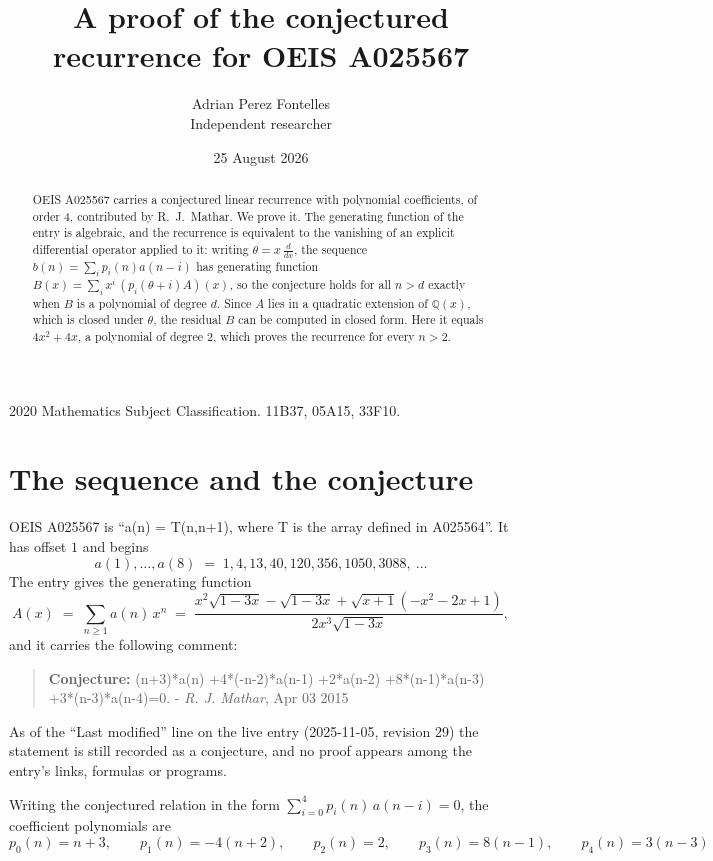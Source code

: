 \documentclass[11pt,a4paper]{article}
\title{A proof of the conjectured recurrence for OEIS A025567}
\author{Adrian Perez Fontelles\\ \small Independent researcher}
\date{25 August 2026}
\theoremstyle{plain}
\theoremstyle{definition}
\begin{document}
\maketitle

\begin{abstract}
OEIS A025567 carries a conjectured linear recurrence with polynomial coefficients, of
order 4, contributed by R.~J.~Mathar. We prove it. The generating function of the
entry is algebraic, and the recurrence is equivalent to the vanishing of an explicit
differential operator applied to it: writing $\theta=x\,\frac{d}{dx}$, the sequence
$b(n)=\sum_{i}p_{i}(n)a(n-i)$ has generating function
$B(x)=\sum_{i}x^{i}\,(p_{i}(\theta+i)A)(x)$, so the conjecture holds for all $n>d$ exactly
when $B$ is a polynomial of degree $d$. Since $A$ lies in a quadratic extension of
$\mathbb{Q}(x)$, which is closed under $\theta$, the residual $B$ can be computed in
closed form. Here it equals $4 x^{2} + 4 x$, a polynomial of degree $2$, which proves
the recurrence for every $n>2$.
\end{abstract}

\noindent\small 2020 Mathematics Subject Classification. 11B37, 05A15, 33F10.\normalsize

\section{The sequence and the conjecture}

OEIS A025567 is ``a(n) = T(n,n+1), where T is the array defined in A025564''. It has offset $1$ and begins
\[
a(1),\dots,a(8)\;=\;1, 4, 13, 40, 120, 356, 1050, 3088,\ \dots
\]
The entry gives the generating function
\begin{equation}\label{eq:gf}
A(x)\;=\;\sum_{n\ge 1} a(n)\,x^{n}\;=\;\frac{x^{2} \sqrt{1 - 3 x} - \sqrt{1 - 3 x} + \sqrt{x + 1} \left(- x^{2} - 2 x + 1\right)}{2 x^{3} \sqrt{1 - 3 x}} ,
\end{equation}
and it carries the following comment:
\begin{quote}\small
\textbf{Conjecture:} (n+3)*a(n) +4*(-n-2)*a(n-1) +2*a(n-2) +8*(n-1)*a(n-3) +3*(n-3)*a(n-4)=0. - \emph{R. J. Mathar}, Apr 03 2015
\end{quote}
As of the ``Last modified'' line on the live entry (2025-11-05, revision 29) the
statement is still recorded as a conjecture, and no proof appears among the entry's links,
formulas or programs.

Writing the conjectured relation in the form $\sum_{i=0}^{4}p_{i}(n)\,a(n-i)=0$,
the coefficient polynomials are
\[
p_{0}(n)=n + 3,\qquad p_{1}(n)=- 4 \left(n + 2\right),\qquad p_{2}(n)=2,\qquad p_{3}(n)=8 \left(n - 1\right),\qquad p_{4}(n)=3 \left(n - 3\right)
\]
\end{document}
